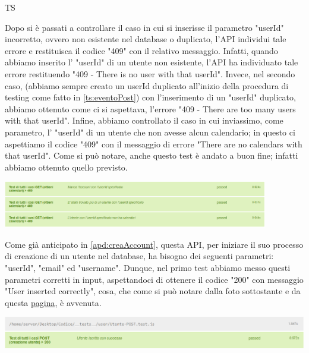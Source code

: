 \begin{listaPersonale}{TS}
\begin{center}
                \end{center}
                Dopo si è passati a controllare il caso in cui si inserisse il parametro "userId" incorretto, ovvero non esistente nel database o duplicato, l'API individui tale errore e restituisca il codice "409" con il relativo messaggio. Infatti, quando abbiamo inserito l' "userId" di un utente non esistente, l'API ha individuato tale errore restituendo "409 - There is no user with that userId". Invece, nel secondo caso, (abbiamo sempre creato un userId duplicato all'inizio della procedura di testing come fatto in \ref{ts:eventoPost}) con l'inserimento di un "userId" duplicato, abbiamo ottenuto come ci si aspettava, l'errore "409 - There are too many users with that userId".
                Infine, abbiamo controllato il caso in cui inviassimo, come parametro, l' "userId" di un utente che non avesse alcun calendario; in questo ci aspettiamo il codice "409" con il messaggio di errore "There are no calendars with that userId". Come si può notare, anche questo test è andato a buon fine; infatti abbiamo ottenuto  quello previsto.
                \begin{center}
                        \includegraphics[width=0.87\textwidth, height=0.11\textheight]{img/png/tests/CalendarioGet/409_getCalendari.png}
                \end{center}
                Come già anticipato in \ref{apd:creaAccount}, questa API, per iniziare il suo processo di creazione di un utente nel database, ha bisogno dei seguenti parametri: "userId", "email" ed "username". Dunque, nel primo test abbiamo messo questi parametri corretti in input, aspettandoci di ottenere il codice "200" con messaggio "User inserted correctly", cosa, che come si può notare dalla foto sottostante e da questa \href{https://plan-it.it/test-report.html} {pagina}, è avvenuta.
                \begin{center}
                        \includegraphics[width=1\textwidth, height=0.08\textheight]{img/png/tests/UtentePost/200_postUtente.png}

\end{center}
\end{listaPersonale}
